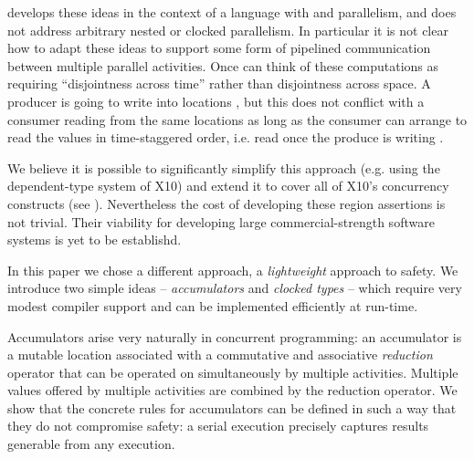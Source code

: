\cite{DPJ} develops these ideas in the context of a language with
 and  parallelism, and does not
address arbitrary nested or clocked parallelism.  In particular it is
not clear how to adapt these ideas to support some form of pipelined
communication between multiple parallel activities. Once can think of
these computations as requiring ``disjointness across time'' rather
than disjointness across space. A producer is going to write into
locations , but this does not
conflict with a consumer reading from the same locations as long as
the consumer can arrange to read the values in time-staggered order,
i.e. read  once the produce is writing .  

We believe it is possible to significantly simplify this approach
(e.g.{} using the dependent-type system of X10) and extend it to cover
all of X10's concurrency constructs (see
). Nevertheless the cost of developing these
region assertions is not trivial. Their viability for developing large
commercial-strength software systems is yet to be establishd.

In this paper we chose a different approach, a {\em lightweight}
approach to safety. We introduce two simple ideas -- {\em
  accumulators} and {\em clocked types} -- which require very modest
compiler support and can be implemented efficiently at run-time.

Accumulators arise very naturally in concurrent programming: an
accumulator is a mutable location associated with a commutative and
associative {\em reduction} operator that can be operated on
simultaneously by multiple activities. Multiple values offered by
multiple activities are combined by the reduction operator. We show
that the concrete rules for accumulators can be defined in such a way
that they do not compromise safety: a serial execution precisely
captures results generable from any execution.

